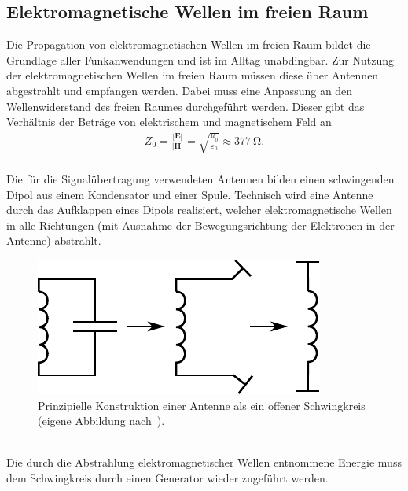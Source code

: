 \documentclass[a4paper,twoside,final]{article}
\begin{document}
\subsection{Elektromagnetische Wellen im freien Raum}
Die Propagation von elektromagnetischen Wellen im freien Raum bildet die Grundlage aller Funkanwendungen und ist im Alltag unabdingbar. Zur Nutzung der elektromagnetischen Wellen im freien Raum müssen diese über Antennen abgestrahlt und empfangen werden. Dabei muss eine Anpassung an den Wellenwiderstand des freien Raumes durchgeführt werden. Dieser gibt das Verhältnis der Beträge von elektrischem und magnetischem Feld an
\begin{align}
  Z_0 = \frac{|\bm{E}|}{|\bm{H}|} = \sqrt{\frac{\mu_0}{\varepsilon_0}} \approx \SI{377}{\ohm}.
\end{align}\\
Die für die Signalübertragung verwendeten Antennen bilden einen schwingenden Dipol aus einem Kondensator und einer Spule. Technisch wird eine Antenne durch das Aufklappen eines Dipols realisiert, welcher elektromagnetische Wellen in alle Richtungen (mit Ausnahme der Bewegungsrichtung der Elektronen in der Antenne) abstrahlt.
\begin{figure}[htp]
    \centering
    \includegraphics{Schaltungen/offenerSchwingkreis.pdf}
    \caption{Prinzipielle Konstruktion einer Antenne als ein offener Schwingkreis (eigene Abbildung nach~\cite{Perner}).}
    \label{fig:Schwingkreis}
\end{figure}\\
Die durch die Abstrahlung elektromagnetischer Wellen entnommene Energie muss dem Schwingkreis durch einen Generator wieder zugeführt werden.
\end{document}
